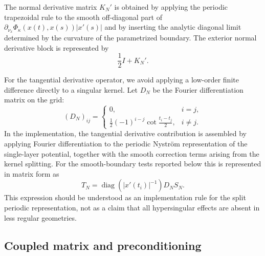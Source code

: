 \documentclass[11pt]{article}
\numberwithin{equation}{section}
\begin{document}
The normal derivative matrix $K_N'$ is obtained by applying the periodic trapezoidal rule to the smooth off-diagonal part of $\partial_{\nu_x}\Phi_\kappa(x(t),x(s))|x'(s)|$ and by inserting the analytic diagonal limit determined by the curvature of the parametrized boundary. The exterior normal derivative block is represented by
\[
\frac12 I+K_N' .
\]

For the tangential derivative operator, we avoid applying a low-order finite difference directly to a singular kernel. Let $D_N$ be the Fourier differentiation matrix on the grid:
\begin{equation}
(D_N)_{ij}=
\begin{cases}
0,&i=j,\\[1mm]
\displaystyle \frac12(-1)^{i-j}\cot\frac{t_i-t_j}{2},&i\ne j .
\end{cases}
\end{equation}
In the implementation, the tangential derivative contribution is assembled by applying Fourier differentiation to the periodic Nystr\"om representation of the single-layer potential, together with the smooth correction terms arising from the kernel splitting. For the smooth-boundary tests reported below this is represented in matrix form as
\begin{equation}
T_N=\operatorname{diag}(|x'(t_i)|^{-1})D_NS_N .
\label{eq:tangent_matrix_en}
\end{equation}
This expression should be understood as an implementation rule for the split periodic representation, not as a claim that all hypersingular effects are absent in less regular geometries.

\subsection{Coupled matrix and preconditioning}
\end{document}
